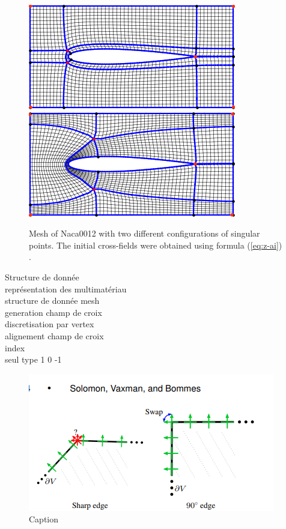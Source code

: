 \begin{figure}[!h]
\centering
\includegraphics[scale=0.65]{images/nacas_normal.png}\hspace{0.5cm}
\includegraphics[scale=0.65]{images/naca_obus.png}
\caption{Mesh of Naca0012 with two different configurations of singular points. The initial cross-fields were obtained using formula (\ref{eq:z-ai}) .}
\label{connexe2}
\end{figure}

Structure de donnée\\
représentation des multimatériau\\


structure de donnée mesh
\[\]
generation champ de croix\\
discretisation par vertex\\
alignement champ de croix
\[\]
index\\
seul type 1 0 -1
\begin{figure}
    \centering
    \includegraphics{images/inspi_1.png}
    \caption{Caption}
    \label{fig:enter-label}
\end{figure}

